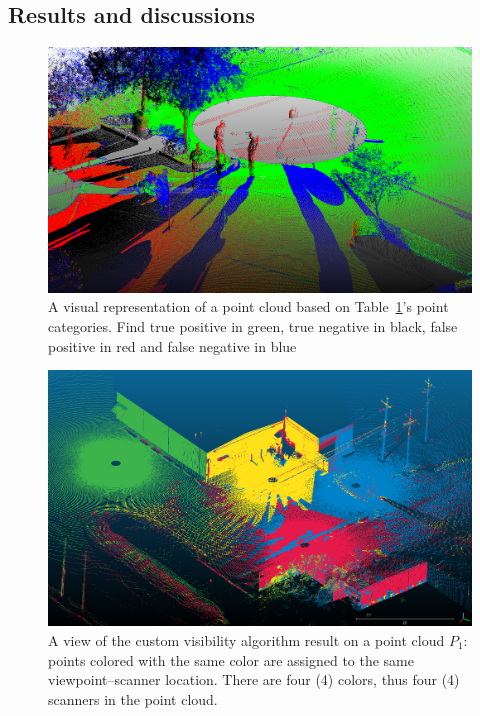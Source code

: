\subsection{Results and discussions}
\begin{figure}[h]
  \centering
  \includegraphics[scale=0.3]{img/positive-negative.png}
  \caption{A visual representation of a point cloud based on Table~\ref{fig:positive-negative}'s point categories. Find true positive in green, true negative in black, false positive in red and false negative in blue}
  \label{fig:positive-negative}
\end{figure}
\begin{figure}[h]
  \centering
  \includegraphics[scale=0.35]{img/custom-result1.png}
  \caption{A view of the custom visibility algorithm result on a point cloud $P_1$: points colored with the same color are assigned to the same viewpoint--scanner location. There are four (4) colors, thus four (4) scanners in the point cloud.}
  \label{fig:custom-result1}
\end{figure}
